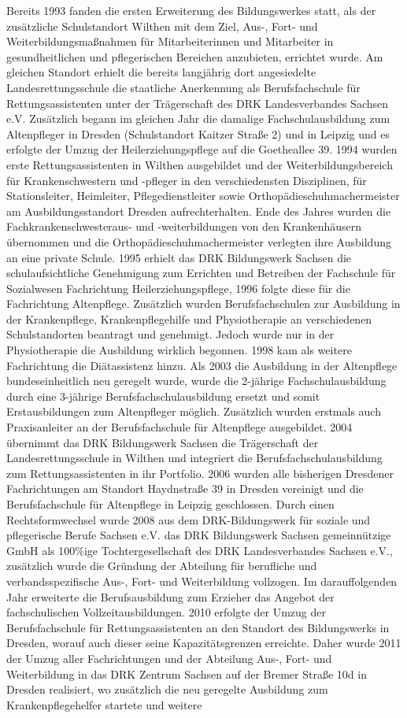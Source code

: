 Bereits 1993 fanden die ersten Erweiterung des Bildungswerkes statt, als der zusätzliche Schulstandort Wilthen mit dem Ziel, Aus-, Fort- und Weiterbildungsmaßnahmen für Mitarbeiterinnen und Mitarbeiter in gesundheitlichen und pflegerischen Bereichen anzubieten, errichtet wurde. Am gleichen Standort erhielt die bereits langjährig dort angesiedelte Landesrettungsschule die staatliche Anerkennung als Berufsfachschule für Rettungsassistenten unter der Trägerschaft des DRK Landesverbandes Sachsen e.V. Zusätzlich  begann im gleichen Jahr die damalige Fachschulausbildung zum Altenpfleger in Dresden (Schulstandort Kaitzer Straße 2) und in Leipzig und es erfolgte der Umzug der Heilerziehungspflege auf die Goetheallee 39. 1994 wurden erste Rettungsassistenten in Wilthen ausgebildet und der Weiterbildungsbereich für Krankenschwestern und -pfleger in den verschiedensten Disziplinen, für Stationsleiter, Heimleiter, Pflegedienstleiter sowie Orthopädieschuhmachermeister am Ausbildungsstandort Dresden aufrechterhalten. Ende des Jahres wurden die Fachkrankenschwesteraus- und -weiterbildungen von den Krankenhäusern übernommen und die Orthopädieschuhmachermeister verlegten ihre Ausbildung an eine private Schule. 1995 erhielt das DRK Bildungswerk Sachsen die schulaufsichtliche Genehmigung zum Errichten und Betreiben der Fachschule für Sozialwesen Fachrichtung Heilerziehungspflege, 1996 folgte diese für die Fachrichtung Altenpflege. Zusätzlich wurden Berufsfachschulen zur Ausbildung in der Krankenpflege, Krankenpflegehilfe und Physiotherapie an verschiedenen Schulstandorten beantragt und genehmigt. Jedoch wurde nur in der Physiotherapie die Ausbildung wirklich begonnen. 1998 kam als weitere Fachrichtung die Diätassistenz hinzu. Als 2003 die Ausbildung in der Altenpflege bundeseinheitlich neu geregelt wurde, wurde die 2-jährige Fachschulausbildung durch eine 3-jährige Berufsfachschulausbildung ersetzt und somit Erstausbildungen zum Altenpfleger möglich. Zusätzlich wurden erstmals auch Praxisanleiter an der Berufsfachschule für Altenpflege ausgebildet. 2004 übernimmt das DRK Bildungswerk Sachsen die Trägerschaft der Landesrettungsschule in Wilthen und integriert die Berufsfachschulausbildung zum Rettungsassistenten in ihr Portfolio. 2006 wurden alle bisherigen Dresdener Fachrichtungen am Standort Haydnstraße 39 in Dresden vereinigt und die Berufsfachschule für Altenpflege in Leipzig geschlossen. Durch einen Rechtsformwechsel wurde 2008 aus dem DRK-Bildungswerk für soziale und pflegerische Berufe Sachsen e.V. das DRK Bildungswerk Sachsen gemeinnützige GmbH als 100\%ige Tochtergesellschaft des DRK Landesverbandes Sachsen e.V., zusätzlich wurde die Gründung der Abteilung für berufliche und verbandsspezifische Aus-, Fort- und Weiterbildung vollzogen. Im darauffolgenden Jahr erweiterte die Berufsausbildung zum Erzieher das Angebot der fachschulischen Vollzeitausbildungen. 2010 erfolgte der Umzug der Berufsfachschule für Rettungsassistenten an den Standort des Bildungswerks in Dresden, worauf auch dieser seine Kapazitätsgrenzen erreichte. Daher wurde 2011 der Umzug aller Fachrichtungen und der Abteilung Aus-, Fort- und Weiterbildung in das DRK Zentrum Sachsen auf der Bremer Straße 10d in Dresden realisiert, wo zusätzlich die neu geregelte Ausbildung zum Krankenpflegehelfer startete und weitere 